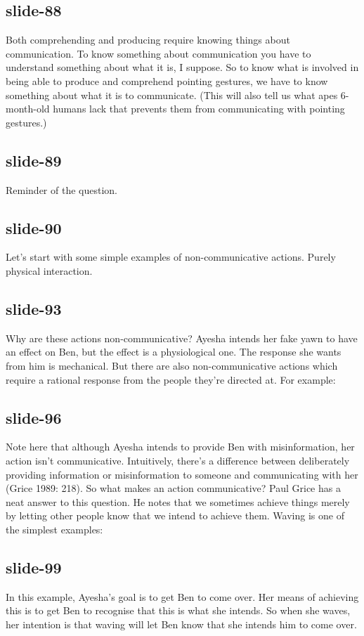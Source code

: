 \documentclass[12pt,\papersize]{extarticle}
\begin{document}
 
\subsection{slide-88}
Both comprehending and producing require knowing things about communication.
To know something about communication you have to understand something about what it is, I suppose.
So to know what is involved in being able to produce and comprehend pointing gestures, we have to know something about what it is to communicate.
(This will also tell us what apes 6-month-old humans lack that prevents them from communicating with pointing gestures.)
 
 
\subsection{slide-89}
Reminder of the question.
 
 
\subsection{slide-90}
Let’s start with some simple examples of non-communicative actions.
Purely physical interaction.
 
 
\subsection{slide-93}
Why are these actions non-communicative? Ayesha intends her fake yawn to have an effect on Ben, but the effect is a physiological one. The response she wants from him is mechanical.
But there are also non-communicative actions which require a rational response from the people they’re directed at. For example:
 
 
\subsection{slide-96}
Note here that although Ayesha intends to provide Ben with misinformation, her action isn’t communicative.
Intuitively, there’s a difference between deliberately providing information or misinformation to someone and communicating with her (Grice 1989: 218).
So what makes an action communicative?
Paul Grice has a neat answer to this question.
He notes that we sometimes achieve things merely by letting other people know that we intend to achieve them.
Waving is one of the simplest examples:
 
 
\subsection{slide-99}
In this example, Ayesha’s goal is to get Ben to come over. Her means of achieving this is to get Ben to recognise that this is what she intends. So when she waves, her intention is that waving will let Ben know that she intends him to come over.
 
\end{document}

